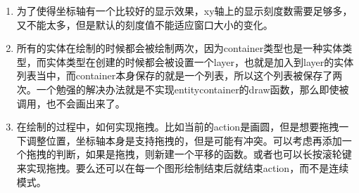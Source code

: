 \begin{enumerate}
	\item 为了使得坐标轴有一个比较好的显示效果，xy轴上的显示刻度数需要足够多，又不能太多，但是默认的刻度值不能适应窗口大小的变化。
	
	\item 所有的实体在绘制的时候都会被绘制两次，因为container类型也是一种实体类型，而实体类型在创建的时候都会被设置一个layer，也就是加入到layer的实体列表当中，而container本身保存的就是一个列表，所以这个列表被保存了两次。一个勉强的解决办法就是不实现entitycontainer的draw函数，那么即使被调用，也不会画出来了。
	
	\item 在绘制的过程中，如何实现拖拽。比如当前的action是画圆，但是想要拖拽一下调整位置，坐标轴本身是支持拖拽的，但是可能有冲突。可以考虑再添加一个拖拽的判断，如果是拖拽，则新建一个平移的函数。或者也可以长按滚轮键来实现拖拽。要么还可以在每一个图形绘制结束后就结束action，而不是连续模式。
\end{enumerate}